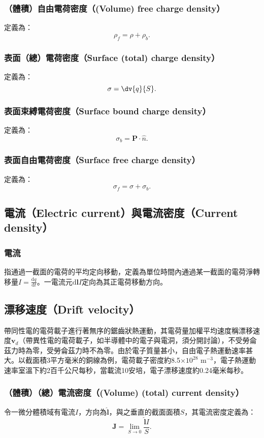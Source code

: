 \documentclass[a4paper,12pt]{report}
\begin{document}
\begin{itemize}
\subsubsection{（體積）自由電荷密度（(Volume) free charge density）}
定義為：
\[\rho_f = \rho + \rho_b.\]
\subsubsection{表面（總）電荷密度（Surface (total) charge density）}
定義為：
\[\sigma = \dv{q}{S}.\]
\subsubsection{表面束縛電荷密度（Surface bound charge density）}
定義為：
\[\sigma_b = \mathbf{P}\cdot\hat{n}.\]
\subsubsection{表面自由電荷密度（Surface free charge density）}
定義為：
\[\sigma_f = \sigma + \sigma_b.\]
\subsection{電流（Electric current）與電流密度（Current density）}
\subsubsection{電流}
指通過一截面的電荷的平均定向移動，定義為單位時間內通過某一截面的電荷淨轉移量$I=\frac{\mathrm{d}q}{\mathrm{d}t}$。一電流元$\mathrm{d}\mathbf{l}I$定向為其正電荷移動方向。
\subsection{漂移速度（Drift velocity）}
帶同性電的電荷載子進行著無序的鋸齒狀熱運動，其電荷量加權平均速度稱漂移速度$\mathbf{v}_d$（帶異性電的電荷載子，如半導體中的電子與電洞，須分開討論），不受勞侖茲力時為零，受勞侖茲力時不為零。由於電子質量甚小，自由電子熱運動速率甚大。以截面積3平方毫米的銅線為例，電荷載子密度約8.5$\times 10^{28}$ m$^{-3}$，電子熱運動速率室溫下約2百千公尺每秒，當載流10安培，電子漂移速度約0.24毫米每秒。
\subsubsection{（體積）（總）電流密度（(Volume) (total) current density）}
令一微分體積域有電流$I$，方向為$\hat{\mathbf{l}} $，與之垂直的截面面積$S$，其電流密度定義為：
\[\mathbf{J} = \lim_{S\to 0}\frac{\hat{\mathbf{l}} I}{S}.\]

\end{itemize}
\end{document}
